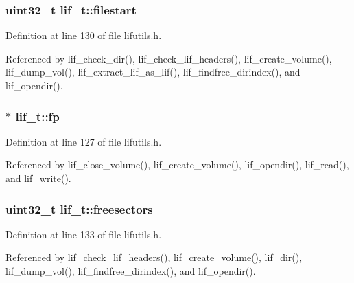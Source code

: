 \subsubsection[{\texorpdfstring{filestart}{filestart}}]{\setlength{\rightskip}{0pt plus 5cm}uint32\+\_\+t lif\+\_\+t\+::filestart}\hypertarget{structlif__t_a3c1bcc66b694d07ebc304ef7cb66b4ef}{}\label{structlif__t_a3c1bcc66b694d07ebc304ef7cb66b4ef}


Definition at line 130 of file lifutils.\+h.



Referenced by lif\+\_\+check\+\_\+dir(), lif\+\_\+check\+\_\+lif\+\_\+headers(), lif\+\_\+create\+\_\+volume(), lif\+\_\+dump\+\_\+vol(), lif\+\_\+extract\+\_\+lif\+\_\+as\+\_\+lif(), lif\+\_\+findfree\+\_\+dirindex(), and lif\+\_\+opendir().

\subsubsection[{\texorpdfstring{fp}{fp}}]{$\ast$ lif\+\_\+t\+::fp}\hypertarget{structlif__t_ad679ba16ca21371a649981a4cca9e64c}{}\label{structlif__t_ad679ba16ca21371a649981a4cca9e64c}


Definition at line 127 of file lifutils.\+h.



Referenced by lif\+\_\+close\+\_\+volume(), lif\+\_\+create\+\_\+volume(), lif\+\_\+opendir(), lif\+\_\+read(), and lif\+\_\+write().

\subsubsection[{\texorpdfstring{freesectors}{freesectors}}]{\setlength{\rightskip}{0pt plus 5cm}uint32\+\_\+t lif\+\_\+t\+::freesectors}\hypertarget{structlif__t_a1fc11461eb5643d84e229772f7623152}{}\label{structlif__t_a1fc11461eb5643d84e229772f7623152}


Definition at line 133 of file lifutils.\+h.



Referenced by lif\+\_\+check\+\_\+lif\+\_\+headers(), lif\+\_\+create\+\_\+volume(), lif\+\_\+dir(), lif\+\_\+dump\+\_\+vol(), lif\+\_\+findfree\+\_\+dirindex(), and lif\+\_\+opendir().

